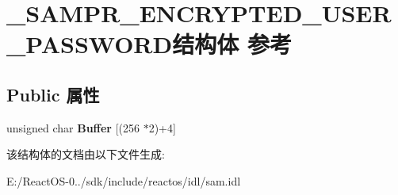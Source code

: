 \hypertarget{struct___s_a_m_p_r___e_n_c_r_y_p_t_e_d___u_s_e_r___p_a_s_s_w_o_r_d}{}\section{\+\_\+\+S\+A\+M\+P\+R\+\_\+\+E\+N\+C\+R\+Y\+P\+T\+E\+D\+\_\+\+U\+S\+E\+R\+\_\+\+P\+A\+S\+S\+W\+O\+R\+D结构体 参考}
\label{struct___s_a_m_p_r___e_n_c_r_y_p_t_e_d___u_s_e_r___p_a_s_s_w_o_r_d}
\subsection*{Public 属性}
\begin{DoxyCompactItemize}
\item 
\mbox{\label{struct___s_a_m_p_r___e_n_c_r_y_p_t_e_d___u_s_e_r___p_a_s_s_w_o_r_d_a6c6a4b3b52c2ddf454c1aa9985cb08cd}} 
unsigned char {\bfseries Buffer} \mbox{[}(256 $\ast$2)+4\mbox{]}
\end{DoxyCompactItemize}


该结构体的文档由以下文件生成\+:\begin{DoxyCompactItemize}
\item 
E\+:/\+React\+O\+S-\/0../sdk/include/reactos/idl/sam.\+idl\end{DoxyCompactItemize}
